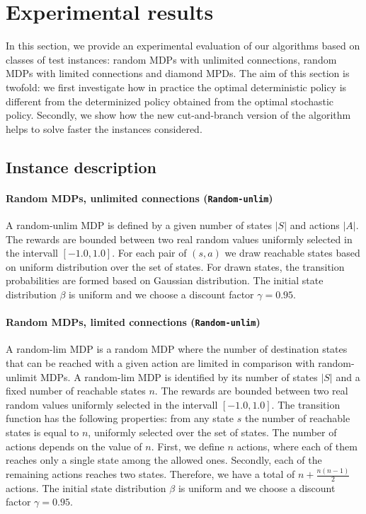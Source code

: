 \section{Experimental results}\label{sec:experiments}

In this section, we provide an experimental evaluation of our algorithms based on  classes of test instances: %
random MDPs with unlimited connections, random MDPs with limited connections and diamond MPDs.  
The aim of this section is twofold: we first investigate how in practice the optimal deterministic policy is different from the determinized policy obtained from the optimal stochastic policy. Secondly, we show how the new cut-and-branch version of the algorithm helps to solve faster the instances considered.


\subsection{Instance description}
\paragraph{Random MDPs, unlimited connections (\texttt{Random-unlim})}
A random-unlim MDP is defined by a given number of states $|S|$ and actions $|A|$. The rewards are bounded between two real random values uniformly selected in the intervall $[-1.0,1.0]$. 
For each pair of $(s, a)$ we draw reachable states based on uniform distribution over the set of states. For drawn states, the transition probabilities are formed based on Gaussian distribution. The initial state distribution $\beta$ is uniform and we choose a discount factor $\gamma = 0.95$. 
\paragraph{Random MDPs, limited connections (\texttt{Random-unlim})}
A random-lim MDP is a random MDP where the number of destination states that can be reached with a given action are limited in comparison with random-unlimit MDPs. A random-lim MDP is identified by its number of states $|S|$ and a fixed number of reachable states $n$. The rewards are bounded between two real random values uniformly selected in the intervall $[-1.0,1.0]$.
The transition function has the following properties: from any state $s$ the number of reachable states is equal to $n$, uniformly selected over the set of states.
The number of actions depends on the value of $n$. First, we define $n$ actions, where each of them reaches only a single state among the allowed ones. Secondly, each of the remaining actions reaches two states. Therefore, we have a total of $n+\frac{n(n-1)}{2}$ actions. The initial state distribution $\beta$ is uniform and we choose a discount factor $\gamma = 0.95$.
